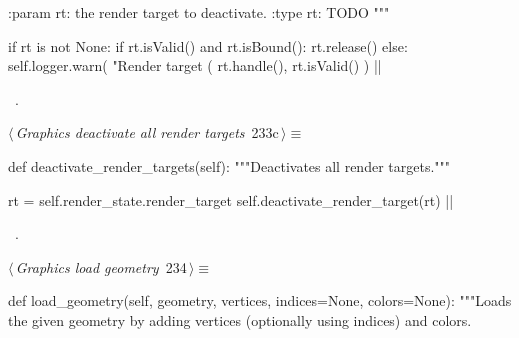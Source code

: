 \documentclass[%
    a4paper,    %
    justified,  %
    nobib,      %
    openany     %
]{tufte-book}
\makeatletter
\renewcommand{\label}[1]{\@tufte@label{##1}}%
\makeatother
\begin{document}
\begin{fullwidth}
\begin{flushleft}
\begin{minipage}{\linewidth}
\begin{pythoncode}
    :param rt: the render target to deactivate.
    :type  rt: TODO
    """

    if rt is not None:
        if rt.isValid() and rt.isBound():
            rt.release()
        else:
            self.logger.warn(
                "Render target (%
                rt.handle(), rt.isValid()
            )
|\NWsep|
\end{pythoncode}
\vspace{1.5ex}
\footnotesize
\begin{list}{}{\setlength{\itemsep}{-\parsep}\setlength{\itemindent}{-\leftmargin}}
\item \NWtxtMacroRefIn\ .

\item{}
\end{list}
\end{minipage}\vspace{4ex}
\end{flushleft}
\begin{flushleft} \small
\begin{minipage}{\linewidth}\label{scrap249}\raggedright\small
{} $\langle\,${\itshape Graphics deactivate all render targets}\nobreak\ {\footnotesize {233c}}$\,\rangle\equiv$
\vspace{-1ex}
\begin{pythoncode}
def deactivate_render_targets(self):
    """Deactivates all render targets."""

    rt = self.render_state.render_target
    self.deactivate_render_target(rt)
|\NWsep|
\end{pythoncode}
\vspace{1.5ex}
\footnotesize
\begin{list}{}{\setlength{\itemsep}{-\parsep}\setlength{\itemindent}{-\leftmargin}}
\item \NWtxtMacroRefIn\ .

\item{}
\end{list}
\end{minipage}\vspace{4ex}
\end{flushleft}
\begin{flushleft} \small
\begin{minipage}{\linewidth}\label{scrap250}\raggedright\small
{} $\langle\,${\itshape Graphics load geometry}\nobreak\ {\footnotesize {234}}$\,\rangle\equiv$
\vspace{-1ex}
\begin{pythoncode}
def load_geometry(self, geometry, vertices, indices=None, colors=None):
    """Loads the given geometry by adding vertices (optionally using
    indices) and colors.


\end{pythoncode}
\end{minipage}
\end{flushleft}
\end{fullwidth}
\end{document}
